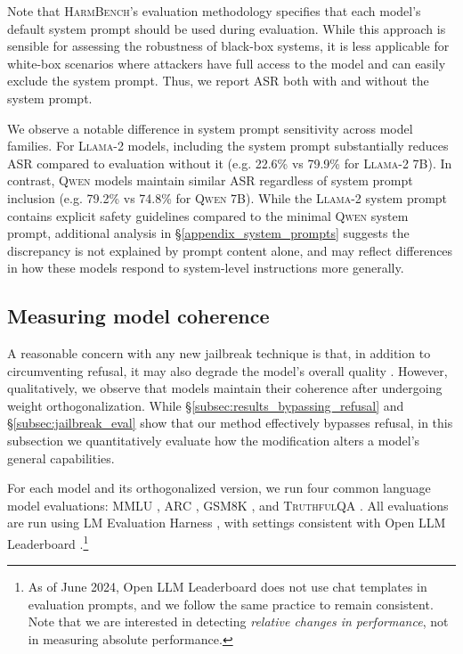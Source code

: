 \documentclass{article}
\begin{document}
Note that \textsc{HarmBench}'s evaluation methodology specifies that each model's default system prompt should be used during evaluation.
While this approach is sensible for assessing the robustness of black-box systems, it is less applicable for white-box scenarios where attackers have full access to the model and can easily exclude the system prompt.
Thus, we report ASR both with and without the system prompt.

We observe a notable difference in system prompt sensitivity across model families.
For \textsc{Llama-2} models, including the system prompt substantially reduces ASR compared to evaluation without it (e.g. 22.6\% vs 79.9\% for \textsc{Llama-2 7B}).
In contrast, \textsc{Qwen} models maintain similar ASR regardless of system prompt inclusion (e.g. 79.2\% vs 74.8\% for \textsc{Qwen 7B}).
While the \textsc{Llama-2} system prompt contains explicit safety guidelines compared to the minimal \textsc{Qwen} system prompt, additional analysis in \S\ref{appendix_system_prompts} suggests the discrepancy is not explained by prompt content alone, and may reflect differences in how these models respond to system-level instructions more generally.

\subsection{Measuring model coherence}
\label{subsec:coherence}

A reasonable concern with any new jailbreak technique is that, in addition to circumventing refusal, it may also degrade the model's overall quality \citep{souly2024strongreject}.
However, qualitatively, we observe that models maintain their coherence after undergoing weight orthogonalization.
While \S\ref{subsec:results_bypassing_refusal} and \S\ref{subsec:jailbreak_eval} show that our method effectively bypasses refusal, in this subsection we quantitatively evaluate how the modification alters a model's general capabilities.

For each model and its orthogonalized version, we run four common language model evaluations:
\textsc{MMLU} \citep{hendrycks2020measuring_mmlu},
\textsc{ARC} \citep{clark2018think},
\textsc{GSM8K} \citep{cobbe2021training},
and \textsc{TruthfulQA} \citep{lin2021truthfulqa}.
All evaluations are run using LM Evaluation Harness \citep{eval-harness}, with settings consistent with Open LLM Leaderboard \citep{open-llm-leaderboard}.\footnote{
As of June 2024, Open LLM Leaderboard does not use chat templates in evaluation prompts, and we follow the same practice to remain consistent.
Note that we are interested in detecting \emph{relative changes in performance}, not in measuring absolute performance.
}
\end{document}
